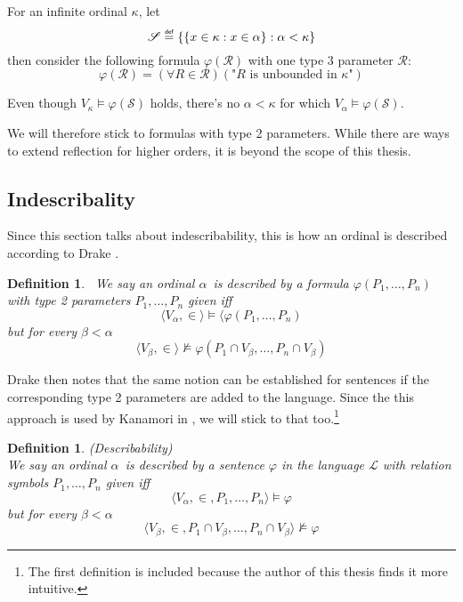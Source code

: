 \documentclass[12pt,a4paper]{article}
\newtheorem{definition}[theorem]{Definition}
\newcommand\defeq{\mathrel{\overset{\makebox[0pt]{\mbox{\normalfont\tiny\sffamily def}}}{=}}}
\begin{document}
For an infinite ordinal $\kappa$, let
\begin{equation}
\mathscr{S} \defeq \{\{x \in \kappa : x \in \alpha \}:\alpha < \kappa \}
\end{equation}
then consider the following formula $\varphi(\mathscr{R})$ with one type 3 parameter $\mathscr{R}$:
\begin{equation}
\varphi(\mathscr{R}) = (\forall R \in \mathscr{R})(\mbox{"$R$ is unbounded in $\kappa$"})
\end{equation}

Even though $V_\kappa \models \varphi(\mathscr{S})$ holds, there's no $\alpha < \kappa$ for which $V_{\alpha} \models \varphi(\mathscr{S})$.

We will therefore stick to formulas with type 2 parameters. While there are ways to extend reflection for higher orders, it is beyond the scope of this thesis.
\subsection{Indescribality}

Since this section talks about indescribability, this is how an ordinal is described according to Drake \cite[Chapter 9]{DrakeBook}.
\begin{definition}\
We say an ordinal $\alpha$ is described by a formula $\varphi(P_1, \ldots, P_n)$ with type 2 parameters $P_1, \ldots, P_n$ given iff
\begin{equation}
\langle V_\alpha, \in \rangle \models \langle \varphi(P_1, \ldots, P_n)
\end{equation}
but for every $\beta < \alpha$
\begin{equation}
\langle V_\beta, \in \rangle \not\models \varphi(P_1 \cap V_\beta, \ldots, P_n \cap V_\beta)
\end{equation}
\end{definition}

Drake then notes that the same notion can be established for sentences if the corresponding type 2 parameters are added to the language. Since the this approach is used by Kanamori in \cite{KanamoriBook}, we will stick to that too.\footnote{The first definition is included because the author of this thesis finds it more intuitive.}
\begin{definition}{(Describability)}\label{def:describability}\\
We say an ordinal $\alpha$ is described by a sentence $\varphi$ in the language $\mathscr{L}$ with relation symbols $P_1, \ldots, P_n$ given iff
\begin{equation}
\langle V_\alpha, \in, P_1, \ldots, P_n \rangle \models \varphi
\end{equation}
but for every $\beta < \alpha$
\begin{equation}
\langle V_\beta, \in, P_1 \cap V_\beta, \ldots, P_n \cap V_\beta \rangle \not\models \varphi
\end{equation}
\end{definition}
\end{document}

